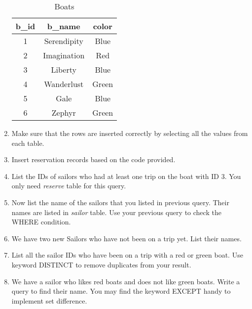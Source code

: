 \documentclass{homework}
\begin{document}
\begin{enumerate}[label=\alph*)]
\begin{table}[!ht]
        \begin{tabular}{|c|c|c|}
             \hline
             b\_id& b\_name& color\\
             \hline
             1& Serendipity& Blue\\
             \hline
             2& Imagination& Red\\
             \hline
             3& Liberty& Blue\\
             \hline
             4& Wanderlust& Green\\
             \hline
             5& Gale& Blue\\
             \hline
             6& Zephyr& Green\\
             \hline
        \end{tabular}
        \caption{Boats}
        \label{tab:2}
    \end{table}

    \item Make sure that the rows are inserted correctly by selecting all the values from each table.

    \item Insert reservation records based on the code provided.
    \item List the IDs of sailors who had at least one trip on the boat with ID 3. You only need \textit{reserve} table for this query.
    \item Now list the name of the sailors that you listed in previous query. Their names are listed in \textit{sailor} table. Use your previous query to check the WHERE condition.
    \item We have two new Sailors who have not been on a trip yet. List their names.
    \item List all the sailor IDs who have been on a trip with a red or green boat. Use keyword DISTINCT to remove duplicates from your result.
    \item We have a sailor who likes red boats and does not like green boats. Write a query to find their name. You may find the keyword EXCEPT handy to implement set difference. 
    
\end{enumerate}



\end{document}
